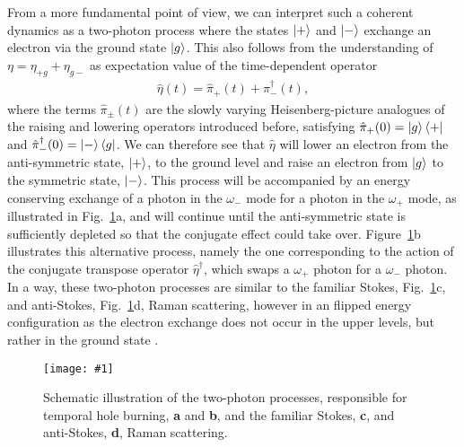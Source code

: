 \documentclass[onecolumn,secnumarabic,amssymb, nobibnotes, aip, prd]{revtex4-1}
\def\P{\hat{\pi}_+}
\def\M{\hat{\pi}_-}
\newcommand{\includegraphicsM}[1]{\texttt{[image: \#1]}}
\begin{document}
From a more fundamental point of view, we can interpret such a coherent dynamics as a two-photon process where the states $\ket{+}$ and $\ket{-}$ exchange an electron via the ground state $\ket{g}$. This also follows from the understanding of $\eta = \eta_{+g}+\eta_{g-}$ as expectation value of the time-dependent operator \cite{loudon2000quantum}
\begin{align}
\hat\eta(t) = \P(t) +\M^{\dagger}(t),
\end{align}
where the terms $\hat\pi_{\pm}(t)$ are the slowly varying Heisenberg-picture analogues of the raising and lowering operators introduced before, satisfying $\P(0) =\ket{g}\bra{+}$ and $\M^{\dagger}(0)=\ket{-}\bra{g}$. We can therefore see that $\hat\eta$ will lower an electron from the anti-symmetric state, $\ket{+}$, to the ground level and raise an electron from $\ket{g}$ to the symmetric state, $\ket{-}$. This process will be accompanied by an energy conserving exchange of a photon in the $\omega_{-}$ mode for a photon in the $\omega_{+}$ mode, as illustrated in Fig.~\ref{fig:two_photon_process}a, and will continue until the anti-symmetric state is sufficiently depleted so that the conjugate effect could take over. Figure~\ref{fig:two_photon_process}b illustrates this alternative process, namely the one corresponding to the action of the conjugate transpose operator $\hat{\eta}^{\dagger}$, which swaps a $\omega_+$ photon for a $\omega_-$ photon. In a way, these two-photon processes are similar to the familiar Stokes, Fig.~\ref{fig:two_photon_process}c, and anti-Stokes, Fig.~\ref{fig:two_photon_process}d, Raman scattering, however in an flipped energy configuration as the electron exchange does not occur in the upper levels, but rather in the ground state \cite{butcher1991elements}. 
\begin{figure}[h!]
	\begin{center}
		\includegraphicsM{IMGS/two_photon_process2.eps}
		\caption{Schematic illustration of the two-photon processes, responsible for temporal hole burning, \textbf{a} and \textbf{b}, and the familiar Stokes, \textbf{c}, and anti-Stokes, \textbf{d}, Raman scattering.} \label{fig:two_photon_process}
	\end{center}	
\end{figure}
\end{document}
